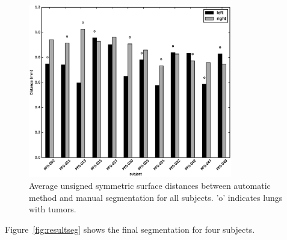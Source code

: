 \documentclass{llncs}
\begin{document}
\begin{figure}[t]
  \centering
    \includegraphics[width=3.5in]{figs/distUnsignSym}
  \caption{Average unsigned symmetric surface distances between automatic method and manual segmentation for all subjects. 'o' indicates lungs with tumors.}
  \label{fig:dist}
\end{figure}

Figure~\ref{fig:resultseg} shows the final segmentation for four subjects. 
\end{document}
